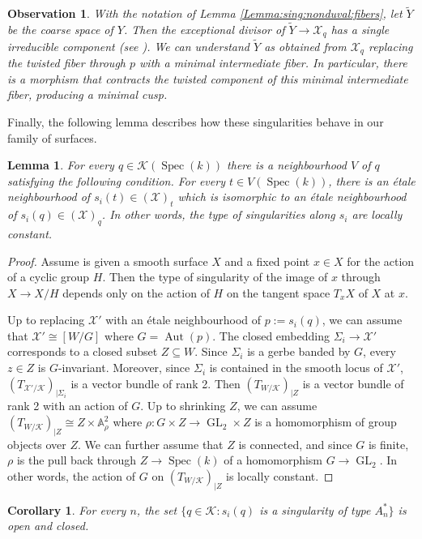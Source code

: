 \documentclass[11pt]{amsart}
\newcommand{\sX}{\mathscr{X}}
\newcommand{\spec}{\operatorname{Spec}}
\newcommand{\Kg}{\mathcal{K}}
\newtheorem{Lemma}[theorem]{Lemma}
\newtheorem{Oss}[theorem]{Observation}
\newtheorem{Cor}[theorem]{Corollary}
\theoremstyle{definition}
\begin{document}
 \begin{Oss}\label{Oss:contract:intermediate:nonduval}
 With the notation of Lemma \ref{Lemma:sing:nonduval:fibers}, let $\widetilde{Y}$ be the coarse space of $Y$. Then
 the exceptional divisor of $\widetilde{Y} \to \sX_q$ has a single irreducible component (see \cite{Kollarresol}). We can understand $\widetilde{Y}$
 as obtained from $\sX_q$ replacing the twisted fiber through $p$ with a \emph{minimal} intermediate fiber. In particular, there is a morphism
 that contracts the twisted component of this minimal intermediate fiber, producing a minimal cusp.
\end{Oss}
 Finally, the following lemma describes how these singularities behave in our family of surfaces.
 \begin{Lemma}\label{Lemma:open:and:closed:sing}
 For every $q \in \Kg(\spec(k))$ there is a neighbourhood $V$ of $q$ satisfying the following condition.
 For every $t \in V(\spec(k))$, there is an étale neighbourhood of $s_i(t) \in (\sX)_t$ which is isomorphic to an
 étale neighbourhood of $s_i(q) \in (\sX)_q$.
In other words, the type of singularities along $s_i$ are locally constant.
 \end{Lemma}
  \begin{proof}
  Assume is given a smooth surface $X$ and a fixed point $x \in X$ for the action of a cyclic group $H$. Then the
  type of singularity of the image of $x$ through $X \to X/H$ depends only on the action of $H$ on the tangent space $T_xX$ of $X$ at $x$. 
  
  Up to replacing $\sX'$ with an étale neighbourhood of $p:=s_i(q)$, we can assume that $\sX' \cong [W/G]$ where $G=\operatorname{Aut}(p)$.
  The closed embedding $\Sigma_i \to \sX'$ corresponds to a closed subset $Z\subseteq W$. Since $\Sigma_i$ is a gerbe banded by $G$,
  every $z \in Z$ is $G$-invariant. Moreover, since $\Sigma_i$ is contained in the smooth locus of $\sX'$, $(T_{\sX'/\Kg})_{|\Sigma_i}$
  is a vector bundle of rank 2. Then $(T_{W/\Kg})_{|Z}$ is a vector bundle of rank 2 with an action of $G$. Up to shrinking $Z$, we can assume
  $(T_{W/\Kg})_{|Z} \cong Z \times \mathbb{A}^2_{\rho}$ where $\rho:G\times Z \to \operatorname{GL}_2\times Z$ is a homomorphism
  of group objects over $Z$. We can further assume that $Z$ is connected, and since $G$ is finite, $\rho$ is the pull back through $Z \to \spec(k)$ of a homomorphism $G \to \operatorname{GL}_2$. In other words, the action of $G$ on $(T_{W/\Kg})_{|Z}$ is locally constant.
 \end{proof}
 \begin{Cor}\label{Cor:sing:open:and:closed}
   For every $n$, the set $\{q \in \Kg: s_i(q)$ is a singularity of type $A_n^*\}$ is open and closed.
 \end{Cor}
\end{document}
